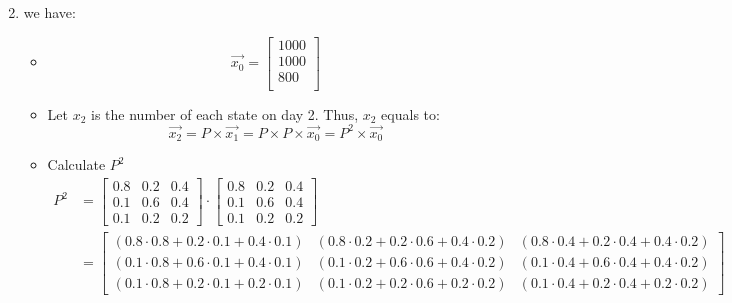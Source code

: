 \documentclass{article}
\begin{document}
\begin{enumerate}[label = ({\alph*})]
\begin{itemize}
\[                \]
            \end{itemize}
                \item we have:
                \begin{itemize}
                \item \[\vec{x_{0}} = 
                \begin{bmatrix}
                    1000 \\
                    1000 \\
                    800 \\
                \end{bmatrix}
                    \]
                \item Let \(x_{2}\) is the number of each state on day 2. Thus, \(x_{2}\) equals to:
                \[\vec{x_{2}} = P \times \vec{x_{1}} = P \times P \times \vec{x_{0}} = P^{2} \times \vec{x_{0}}\]
                \item Calculate \(P^{2}\)
                \begin{align}
                    P^2 &= \begin{bmatrix}
                        0.8 & 0.2 & 0.4 \\
                        0.1 & 0.6 & 0.4 \\
                        0.1 & 0.2 & 0.2
                        \end{bmatrix}
                        \cdot
                        \begin{bmatrix}
                        0.8 & 0.2 & 0.4 \\
                        0.1 & 0.6 & 0.4 \\
                        0.1 & 0.2 & 0.2
                        \end{bmatrix} \\
                    &= \begin{bmatrix}
                        (0.8\cdot0.8 + 0.2\cdot0.1 + 0.4\cdot0.1) & (0.8\cdot0.2 + 0.2\cdot0.6 + 0.4\cdot0.2) & (0.8\cdot0.4 + 0.2\cdot0.4 + 0.4\cdot0.2) \\
                        (0.1\cdot0.8 + 0.6\cdot0.1 + 0.4\cdot0.1) & (0.1\cdot0.2 + 0.6\cdot0.6 + 0.4\cdot0.2) & (0.1\cdot0.4 + 0.6\cdot0.4 + 0.4\cdot0.2) \\
                        (0.1\cdot0.8 + 0.2\cdot0.1 + 0.2\cdot0.1) & (0.1\cdot0.2 + 0.2\cdot0.6 + 0.2\cdot0.2) & (0.1\cdot0.4 + 0.2\cdot0.4 + 0.2\cdot0.2)
                        \end{bmatrix}\\

\end{align}
\end{itemize}
\end{enumerate}
\end{document}
